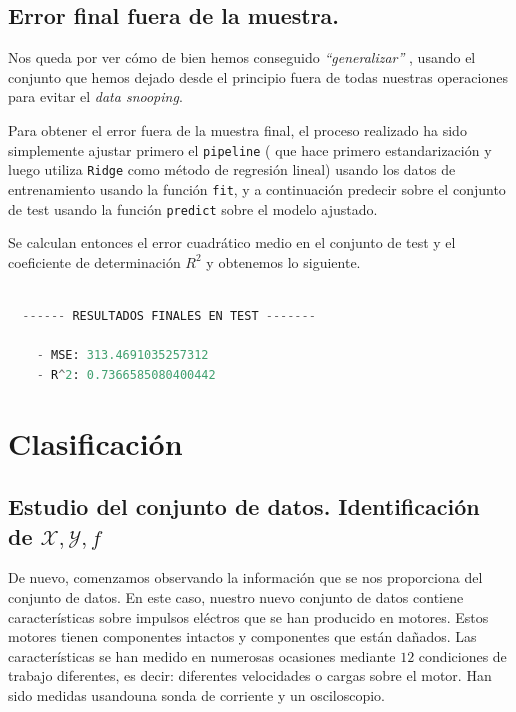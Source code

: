 \documentclass[a4paper, 20pt]{article}
\begin{document}
\subsection{Error final fuera de la muestra.}

Nos queda por ver cómo de bien hemos conseguido \emph{``generalizar''} , usando el conjunto que hemos dejado desde el principio fuera de todas nuestras operaciones para evitar el \emph{data snooping}.

Para obtener el error fuera de la muestra final, el proceso realizado ha sido simplemente ajustar primero  el \lstinline{pipeline} ( que hace primero estandarización y luego utiliza \lstinline{Ridge} como método de regresión lineal) usando los datos de entrenamiento usando la función \lstinline{fit}, y a continuación predecir sobre el conjunto de test usando la función \lstinline{predict} sobre el modelo ajustado.

Se calculan entonces el error cuadrático medio en el conjunto de test y el coeficiente de determinación $R^2$ y obtenemos lo siguiente.

\begin{lstlisting}[language=Python]

  ------ RESULTADOS FINALES EN TEST -------

	- MSE: 313.4691035257312
	- R^2: 0.7366585080400442 

\end{lstlisting}



\newpage

\section{Clasificación}

\subsection{Estudio del conjunto de datos. Identificación de $\mathcal X, \mathcal Y, f$}

De nuevo, comenzamos observando la información que se nos proporciona del conjunto de datos. En este caso, nuestro nuevo conjunto de datos \cite{noauthor_uci_nodate} contiene características sobre impulsos eléctros que se han producido en motores. Estos motores tienen componentes intactos y componentes que están dañados. Las características se han medido en numerosas ocasiones mediante $12$ condiciones de trabajo diferentes, es decir: diferentes velocidades o cargas sobre el motor. Han sido medidas usandouna sonda de corriente y un osciloscopio.
\end{document}
